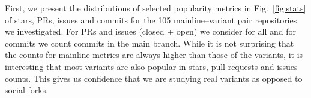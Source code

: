 \begin{figure}[ht]
\centering
\vspace{-.3cm}
    \hfill
    \hfill
    \hfill
    \caption{\rqOne}
     \label{fig:original_common}
     \vspace{-.3cm}
\end{figure}

First, we present the distributions of selected popularity metrics in Fig.~\ref{fig:stats} of stars, PRs, issues and commits for the 105 mainline--variant pair repositories we investigated. For PRs and issues (closed + open) we consider for all and for commits we count commits in the main branch. While it is not surprising that the counts for mainline metrics are always higher than those of the variants, it is interesting that most variants are also popular in stars, pull requests and issues counts. This gives us confidence that we are studying real variants as opposed to social forks. 



